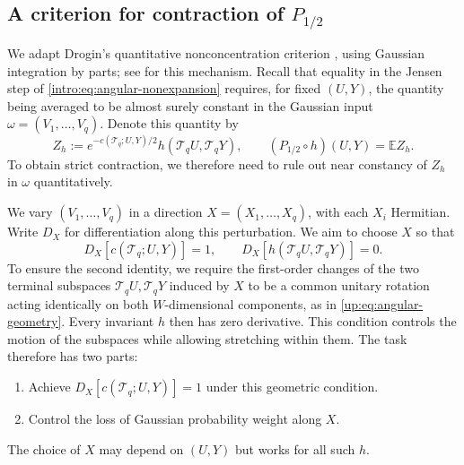 \documentclass[11pt]{article}
\numberwithin{equation}{section}
\theoremstyle{remark}
\newcommand{\E}{\mathbb E}
\begin{document}
\subsection{A criterion for contraction of \texorpdfstring{$P_{1/2}$}{P(1/2)}}
\label{sec:intro-contraction-criterion}
We adapt Drogin's quantitative nonconcentration criterion
\cite[Proposition~2.6 and Claims~2.7--2.8]{Drogin}, using Gaussian
integration by parts; see \cite[Section~3]{Hairer} for this mechanism.
Recall that equality in the Jensen step of
\eqref{intro:eq:angular-nonexpansion} requires, for fixed $(U,Y)$,
the quantity being averaged to be almost surely constant in the
Gaussian input $\omega=(V_1,\ldots,V_q)$.
Denote this quantity by
\[
 Z_h:=e^{-c(\mathcal T_q;U,Y)/2}h(\mathcal T_qU,\mathcal T_qY),
 \qquad (P_{1/2}\circ h)(U,Y)=\E Z_h.
\]
To obtain strict contraction, we therefore need to rule out near
constancy of $Z_h$ in $\omega$ quantitatively.

We vary  $(V_1,\ldots,V_q)$ in a direction
$X=(X_1,\ldots,X_q)$, with each $X_i$ Hermitian. Write $D_X$ for differentiation along this
perturbation. We aim to  choose $X$ so that
\[
 D_X\!\left[c(\mathcal T_q;U,Y)\right]=1,\qquad
 D_X\!\left[h(\mathcal T_qU,\mathcal T_qY)\right]=0.
\]
To ensure the second identity, we require the first-order changes of
the two terminal subspaces $\mathcal T_qU,\mathcal T_qY$ induced by $X$
to be a common unitary rotation acting identically on both
$W$-dimensional components, as in \eqref{up:eq:angular-geometry}.
Every invariant $h$ then has zero derivative. This condition controls
the motion of the subspaces while allowing stretching within them.
The task therefore has two parts:
\begin{enumerate}
\item Achieve $D_X[c(\mathcal T_q;U,Y)]=1$ under this geometric condition.
\item Control the loss of Gaussian probability weight along $X$.
\end{enumerate}
The choice of $X$ may depend on $(U,Y)$
but works for all such $h$.
\end{document}
